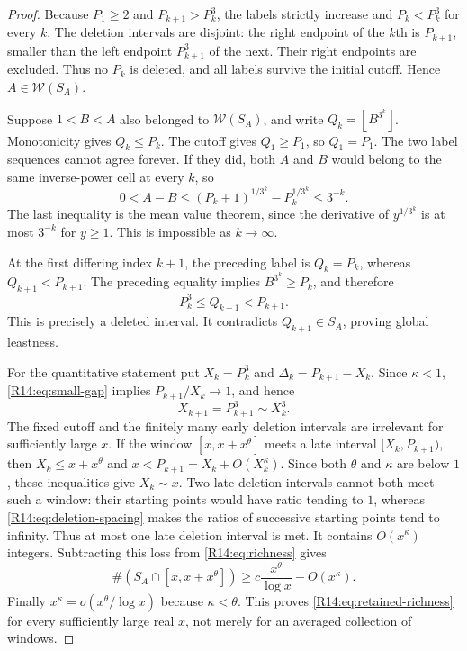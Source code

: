 \documentclass[11pt,a4paper]{article}
\theoremstyle{definition}\newtheorem{definition}[theorem]{Definition}
\theoremstyle{remark}\newtheorem{remark}[theorem]{Remark}
\newcommand{\floor}[1]{\left\lfloor#1\right\rfloor}
\begin{document}
\begin{proof}
Because $P_1\ge2$ and $P_{k+1}>P_k^3$, the labels strictly
increase and $P_k<P_k^3$ for every $k$. The deletion intervals are
disjoint: the right endpoint of the $k$th is $P_{k+1}$, smaller
than the left endpoint $P_{k+1}^3$ of the next. Their right endpoints
are excluded. Thus no $P_k$ is deleted, and all labels survive the
initial cutoff. Hence $A\in\mathcal W(S_A)$.

Suppose $1<B<A$ also belonged to $\mathcal W(S_A)$, and write
$Q_k=\floor{B^{3^k}}$. Monotonicity gives $Q_k\le P_k$.
The cutoff gives $Q_1\ge P_1$, so $Q_1=P_1$. The two label
sequences cannot agree forever. If they did, both $A$ and $B$
would belong to the same inverse-power cell at every $k$, so
\[
 0<A-B\le(P_k+1)^{1/3^k}-P_k^{1/3^k}\le3^{-k}.
\]
The last inequality is the mean value theorem, since the derivative
of $y^{1/3^k}$ is at most $3^{-k}$ for $y\ge1$.
This is impossible as $k\to\infty$.

At the first differing index $k+1$, the preceding label is
$Q_k=P_k$, whereas $Q_{k+1}<P_{k+1}$. The preceding equality
implies $B^{3^k}\ge P_k$, and therefore
\[
 P_k^3\le Q_{k+1}<P_{k+1}.
\]
This is precisely a deleted interval. It contradicts
$Q_{k+1}\in S_A$, proving global leastness.

For the quantitative statement put $X_k=P_k^3$ and
$\Delta_k=P_{k+1}-X_k$. Since $\kappa<1$,
\eqref{R14:eq:small-gap} implies $P_{k+1}/X_k\to1$, and hence
\begin{equation}\label{R14:eq:deletion-spacing}
 X_{k+1}=P_{k+1}^3\sim X_k^3.
\end{equation}
The fixed cutoff and the finitely many early deletion intervals
are irrelevant for sufficiently large $x$. If the window
$[x,x+x^\theta]$ meets a late interval $[X_k,P_{k+1})$, then
$X_k\le x+x^\theta$ and $x<P_{k+1}=X_k+O(X_k^\kappa)$.
Since both $\theta$ and $\kappa$ are below $1$, these inequalities
give $X_k\sim x$. Two late deletion intervals cannot both meet
such a window: their starting points would have ratio tending to
$1$, whereas \eqref{R14:eq:deletion-spacing} makes the ratios of
successive starting points tend to infinity. Thus at most one late
deletion interval is met. It contains $O(x^\kappa)$ integers.
Subtracting this loss from \eqref{R14:eq:richness} gives
\[
 \#(S_A\cap[x,x+x^\theta])
 \ge c\frac{x^\theta}{\log x}-O(x^\kappa).
\]
Finally $x^\kappa=o(x^\theta/\log x)$ because $\kappa<\theta$.
This proves \eqref{R14:eq:retained-richness} for every sufficiently
large real $x$, not merely for an averaged collection of windows.
\end{proof}
\end{document}
